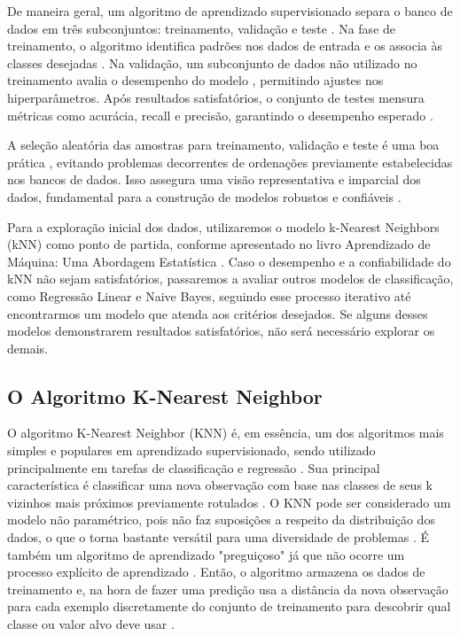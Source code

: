 De maneira geral, um algoritmo de aprendizado supervisionado separa o banco de dados em três subconjuntos: treinamento, validação e teste \cite{izbicki2020}. Na fase de treinamento, o algoritmo identifica padrões nos dados de entrada e os associa às classes desejadas \cite{izbicki2020}. Na validação, um subconjunto de dados não utilizado no treinamento avalia o desempenho do modelo \cite{izbicki2020}, permitindo ajustes nos hiperparâmetros. Após resultados satisfatórios, o conjunto de testes mensura métricas como acurácia, recall e precisão, garantindo o desempenho esperado \cite{izbicki2020}.

A seleção aleatória das amostras para treinamento, validação e teste é uma boa prática \cite{izbicki2020}, evitando problemas decorrentes de ordenações previamente estabelecidas nos bancos de dados. Isso assegura uma visão representativa e imparcial dos dados, fundamental para a construção de modelos robustos e confiáveis \cite{izbicki2020}.

Para a exploração inicial dos dados, utilizaremos o modelo k-Nearest Neighbors (kNN) como ponto de partida, conforme apresentado no livro Aprendizado de Máquina: Uma Abordagem Estatística . Caso o desempenho e a confiabilidade do kNN não sejam satisfatórios, passaremos a avaliar outros modelos de classificação, como Regressão Linear e Naive Bayes, seguindo esse processo iterativo até encontrarmos um modelo que atenda aos critérios desejados. Se alguns desses modelos demonstrarem resultados satisfatórios, não será necessário explorar os demais.

\subsection{O Algoritmo K-Nearest Neighbor}
O algoritmo K-Nearest Neighbor (KNN) é, em essência, um dos algoritmos mais simples e populares em aprendizado supervisionado, sendo utilizado principalmente em tarefas de classificação e regressão \cite{zhang2016}. Sua principal característica é classificar uma nova observação com base nas classes de seus k vizinhos mais próximos previamente rotulados \cite{zhang2016}. O KNN pode ser considerado um modelo não paramétrico, pois não faz suposições a respeito da distribuição dos dados, o que o torna bastante versátil para uma diversidade de problemas \cite{zhang2016}. É também um algoritmo de aprendizado "preguiçoso" já que não ocorre um processo explícito de aprendizado \cite{zhang2016}.  Então, o algoritmo armazena os dados de treinamento e, na hora de fazer uma predição usa a distância da nova observação para cada exemplo discretamente do conjunto de treinamento para descobrir qual classe ou valor alvo deve usar \cite{zhang2016}.

